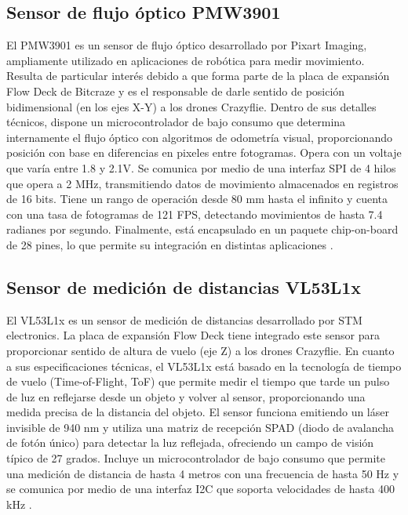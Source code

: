  \subsection*{Sensor de flujo óptico PMW3901}
El PMW3901 es un sensor de flujo óptico desarrollado por Pixart Imaging, ampliamente utilizado en aplicaciones de robótica para medir movimiento. Resulta de particular interés debido a que forma parte de la placa de expansión Flow Deck de Bitcraze y es el responsable de darle sentido de posición bidimensional (en los ejes X-Y) a los drones Crazyflie. Dentro de sus detalles técnicos, dispone un microcontrolador de bajo consumo que determina internamente el flujo óptico con algoritmos de odometría visual, proporcionando posición con base en diferencias en pixeles entre fotogramas. Opera con un voltaje que varía entre 1.8 y 2.1V. Se comunica por medio de una interfaz SPI de 4 hilos que opera a 2 MHz, transmitiendo datos de movimiento almacenados en registros de 16 bits. Tiene un rango de operación desde 80 mm hasta el infinito y cuenta con una tasa de fotogramas de 121 FPS, detectando movimientos de hasta 7.4 radianes por segundo. Finalmente, está encapsulado en un paquete chip-on-board de 28 pines, lo que permite su integración en distintas aplicaciones \cite{PMW3901_datasheet}.

\subsection*{Sensor de medición de distancias VL53L1x}
El VL53L1x es un sensor de medición de distancias desarrollado por STM electronics. La placa de expansión Flow Deck tiene integrado este sensor para proporcionar sentido de altura de vuelo (eje Z) a los drones Crazyflie. En cuanto a sus especificaciones técnicas, el VL53L1x está basado en la tecnología de tiempo de vuelo (Time-of-Flight, ToF) que permite medir el tiempo que tarde un pulso de luz en reflejarse desde un objeto y volver al sensor, proporcionando una medida precisa de la distancia del objeto. El sensor funciona emitiendo un láser invisible de 940 nm y utiliza una matriz de recepción SPAD (diodo de avalancha de fotón único) para detectar la luz reflejada, ofreciendo un campo de visión típico de 27 grados. Incluye un microcontrolador de bajo consumo que permite una medición de distancia de hasta 4 metros con una frecuencia de hasta 50 Hz y se comunica por medio de una interfaz I2C que soporta velocidades de hasta 400 kHz \cite{VL53L1x_datasheet}.

